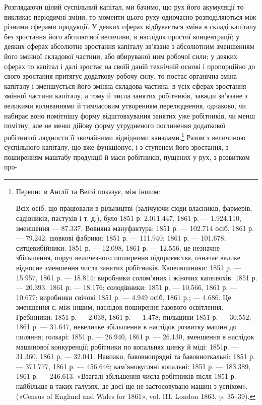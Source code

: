 Розглядаючи цілий суспільний капітал, ми бачимо, що рух
його акумуляції то викликає періодичні зміни, то моменти цього
руху одночасно розподіляються між різними сферами продукції.
У деяких сферах відбувається зміна в складі капіталу без зростання
його абсолютної величини, в наслідок простої концентрації;
у деяких сферах абсолютне зростання капіталу зв’язане з абсолютним
зменшенням його змінної складової частини, або вбируваної
ним робочої сили; у деяких сферах то капітал і далі зростає
на своїй даній технічній основі і пропорційно до свого зростання
притягує додаткову робочу силу, то постає органічна зміна капіталу
і зменшується його змінна складова частина; в усіх сферах
зростання змінної частини капіталу, а тому й числа занятих
робітників, завжди зв’язане з великими коливаннями й тимчасовим
утворенням перелюднення, однаково, чи набирає воно
помітнішу форму відштовхування занятих уже робітників, чи
менш помітну, але не менш дійову форму утрудненого поглинення
додаткової робітничої людности її звичайними відвідними каналами.\footnote{
Перепис в Англії та Велзі показує, між іншим:

Всіх осіб, що працювали в рільництві (залічуючи сюди власників,
фармерів, садівників, пастухів і т. д.), було 1851 р. 2.011.447, 1861 р. —
1.924.110, зменшення — 87.337. Вовняна мануфактура: 1851 р. — 102.714
осіб, 1861 р. — 79.242; шовкові фабрики: 1851 р. — 111.940; 1861 р. —
101.678; ситцевибійники: 1851 р. — 12.098, 1861 р. — 12.556; це незначне
збільшення, поруч величезного поширення підприємства, означає
велике відносне зменшення числа занятих робітників. Капелюшники:
1851 р. — 15.957, 1861 р. — 18.814: виробники солом’яних і жіночих капелюхів:
1851 р. — 20.393, 1861 р. — 18.176; солодівники: 1851 р. —
10.566, 1861 р. — 10.677; виробники свічокі 1851 р. — 4.949 осіб, 1861 р.; —
4.686. Це зменшення є, між іншим, наслідок поширення газового освітлення.
Гребінники: 1851 р. — 2.038, 1861 р. — 1.478; пильщики 1851 р. —
30.552, 1861 р. — 31.647, невеличке збільшення в наслідок розвитку
машин до пиляння; голкарі: 1851 р. — 26.940, 1861 р. — 26.130, зменшення
в наслідок машинової конкуренції; робітники по копальнях цинку й
міді: 1851р. — 31.360, 1861 р, — 32.041. Навпаки, бавовнопрядні та бавовноткальні:
1851 р. — 371.777, 1861 р. — 456.646; кам’яновугляні копальні:
1851 р. — 183.389, 1861 р. — 246.613. «Взагалі збільшення числа робітників
після 1851 р. найбільше в таких галузях, де досі ще не застосовувано
машин з успіхом». («Census of England and Wales for 1861», vol. III.
London 1863, p. 35--39).
}
Разом з величиною суспільного капіталу, що вже функціонує,
і з ступенем його зростання, з поширенням маштабу
продукції й маси робітників, пущених у рух, з розвитком про-
\parbreak{}  %
